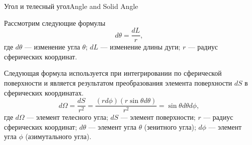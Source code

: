 \documentclass{beamer}
\begin{document}
	\begin{frame}{Угол и телесный угол}{Angle and Solid Angle}

		Рассмотрим следующие формулы
		\[
			d \theta = \frac{d L}{r}	
		,
		\]
		где
		\(d\theta\) --- изменение угла \(\theta\);
		\(dL\) --- изменение длины дуги;
		\(r\) --- радиус сферических координат.
		

		Следующая формула используется при интегрировании по сферической поверхности и является результатом преобразования элемента поверхности \(dS\) в сферических координатах.
		\[
			d \Omega = \frac{dS}{r^2} 
			= 
			\frac{(r d \phi)(r \sin \theta d \theta)}{r^2} 
			= 
			\sin \theta  d \theta d \phi
			,
		\]
		где
		\(d\Omega\) --- элемент телесного угла;
		\(dS\) --- элемент поверхности;
		\(r\) --- радиус сферических координат;
		\(d\theta\) --- элемент угла \(\theta\) (зенитного угла);
		\(d\phi\) --- элемент угла \(\phi\) (азимутального угла).
		

	\end{frame}
\end{document}
